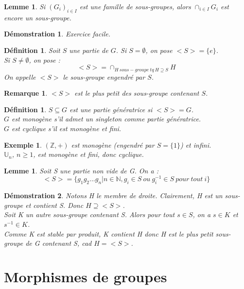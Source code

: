 \documentclass[a4paper, oneside]{report}
\theoremstyle{break}
\newtheorem{defi}[thm]{Définition}
\newtheorem{lemme}[thm]{Lemme}
\newtheorem{exem}[thm]{Exemple}
\newtheorem*{demo}{Démonstration}
\newtheorem{remar}[thm]{Remarque}
\newcommand{\N}{\mathbb{N}}
\newcommand{\Z}{\mathbb{Z}}
\newcommand{\U}{\mathbb{U}}
\begin{document}
\begin{lemme}
	Si $(G_i)_{i\in I}$ est une famille de sous-groupes, alors $\cap_{i\in I}G_i$ est encore un sous-groupe.
\end{lemme}

\begin{demo}
	Exercice facile.
\end{demo}

\begin{defi}
	Soit $S$ une partie de $G$. Si $S=\emptyset$, on pose $<S>=\{e\}$.\\
	Si $S\neq \emptyset$, on pose :
	$$<S> = \cap_{H~sous-groupe~tq~H\supseteq S}H$$
	On appelle $<S>$ le sous-groupe engendré par $S$.
\end{defi}

\begin{remar}
	$<S>$ est le plus petit des sous-groupe contenant $S$.
\end{remar}

\begin{defi}
	$S\subseteq G$ est une partie génératrice si $<S>=G$.\\
	$G$ est monogène s'il admet un singleton comme partie génératrice.\\
	$G$ est cyclique s'il est monogène et fini.
\end{defi}

\begin{exem}
	$(\Z,+)$ est monogène (engendré par $S=\{1\}$) et infini.\\
	$\U_n$, $n\geq 1$, est monogène et fini, donc cyclique.
\end{exem}

\begin{lemme}
	Soit S une partie non vide de G. On a :
	$$<S> = \{g_1g_2...g_n | n\in \N, g_i\in S~ou~g_i^{-1}\in S~pour~tout~i  \}$$
	
\end{lemme}

\begin{demo}
	Notons H le membre de droite. Clairement, H est un sous-groupe et contient S. Donc $H \supseteq <S>$.\\
	Soit K un autre sous-groupe contenant S. Alors pour tout $s\in S$, on a $s\in K$ et $s^{-1}\in K$.\\
	Comme K est stable par produit, K contient H donc H est le plus petit sous-groupe de G contenant S, cad $H=<S>$.
\end{demo}

\section{Morphismes de groupes}
\end{document}
